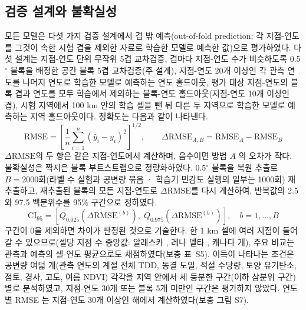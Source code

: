\subsection{검증 설계와 불확실성}
모든 모델은 다섯 가지 검증 설계에서 겹 밖 예측(out-of-fold prediction; 각 지점-연도를 그것이 속한 시험 겹을 제외한 자료로 학습한 모델로 예측한 값)으로 평가하였다\cite{Roberts2017,Ploton2020}. 다섯 설계는 지점-연도 단위 무작위 5겹 교차검증, 겹마다 지점-연도 수가 비슷하도록 0.5$^\circ$ 블록을 배정한 공간 블록 5겹 교차검증(주 설계), 지점-연도 20개 이상인 각 관측 연도를 나머지 연도로 학습한 모델로 예측하는 연도 홀드아웃, 평가 대상 지점-연도의 블록 겹과 연도를 모두 학습에서 제외하는 블록-연도 홀드아웃(지점-연도 10개 이상인 겹), 시험 지역에서 100 km 안의 학습 셀을 뺀 뒤 다른 두 지역으로 학습한 모델로 예측하는 지역 홀드아웃이다. 정확도는 다음과 같이 나타낸다.
\begin{equation}
\mathrm{RMSE} = \left[ \frac{1}{n} \sum_{i=1}^{n} \left( \hat{y}_i - y_i \right)^{2} \right]^{1/2}, \qquad \Delta\mathrm{RMSE}_{A,B} = \mathrm{RMSE}_{A} - \mathrm{RMSE}_{B}
\label{eq:rmse}
\end{equation}
$\Delta\mathrm{RMSE}$의 두 항은 같은 지점-연도에서 계산하며, 음수이면 방법 $A$ 의 오차가 작다. 불확실성은 짝지은 블록 부트스트랩\cite{Efron1993,Roberts2017}으로 정량화하였다. 0.5$^\circ$ 블록을 복원 추출로 $B=2000$회(라벨 수 실험과 공변량 묶음 · 학습기 민감도 실행의 일부는 1000회) 재추출하고, 재추출된 블록의 모든 지점-연도로 $\Delta\mathrm{RMSE}$를 다시 계산하여, 반복값의 2.5와 97.5 백분위수를 95\% 구간으로 정하였다.
\begin{equation}
\mathrm{CI}_{95} = \left[ Q_{0.025}\!\left( \Delta\mathrm{RMSE}^{(b)} \right),\; Q_{0.975}\!\left( \Delta\mathrm{RMSE}^{(b)} \right) \right], \quad b = 1,\ldots,B
\label{eq:ci}
\end{equation}
구간이 0을 제외하면 차이가 판정된 것으로 기술한다. 한 1 km 셀에 여러 지점이 들어갈 수 있으므로(셀당 지점 수 중앙값: 알래스카 \ncySitesMedAk, 레나 델타 \ncySitesMedLe, 캐나다 \ncySitesMedCa{}개), 주요 비교는 관측과 예측의 셀-연도 평균으로도 채점하였다(보충 표~S5). 이득이 나타나는 조건은 공변량 여덟 개(관측 연도의 계절 전체 TDD, 동결 도일, 적설 수당량, 토양 유기탄소, 점토, 경사, 고도, 여름 NDVI) 각각을 지역 안에서 세 등분한 구간(이하 삼분위 구간)별로 분석하였고, 지점-연도 30개 또는 블록 5개 미만인 구간은 평가하지 않았다. 연도별 RMSE 는 지점-연도 30개 이상인 해에서 계산하였다(보충 그림 S7).

